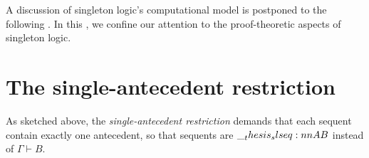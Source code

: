A discussion of singleton logic's computational model is postponed to the following .
In this , we confine our attention to the proof-theoretic aspects of singleton logic.






\section{The single-antecedent restriction}\label{sec:singleton-logic:restriction}

As sketched above, the \emph{single-antecedent restriction} demands that each sequent contain exactly one antecedent, so that sequents are $\slseq{A |- B}$ instead of $\Gamma \vdash B$.

